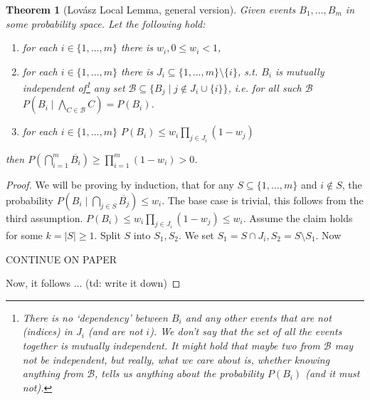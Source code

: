 \documentclass{article}
\theoremstyle{plain}
\newtheorem{thm}{Theorem}
\theoremstyle{definition}
\begin{document}
\begin{thm}[Lovász Local Lemma, general version]
	Given events $B_1,\ldots, B_m$ in some probability space. Let the following hold:
	\begin{enumerate}
		\item for each $i\in\{1,\ldots, m\}$ there is $w_i,0\leq w_i<1$,
		\item for each $i\in\{1,\ldots, m\}$ there is $J_i\subseteq \{1,\ldots, m\}\setminus \{i\}$, s.t. $B_i$ is mutually independent of\footnote{There is no `dependency' between $B_i$ and any other events that are not (indices) in $J_i$ (and are not $i$). We don't say that the set of all the events together is mutually independent. It might hold that maybe two from $\mathcal{B}$ may not be independent, but really, what we care about is, whether knowing anything from $\mathcal{B}$, tells us anything about the probability $P(B_i)$ (and it must not).} any set $\mathcal{B}\subseteq \{B_j \mid j\notin J_i\cup\{i\}\}$, i.e. for all such $\mathcal{B}$ $P(B_i\mid \bigwedge_{C\in\mathcal{B}}C)=P(B_i)$.
		\item for each $i\in\{1,\ldots,m\}$ $P(B_i)\leq w_i\prod_{j\in J_i}(1-w_j)$
	\end{enumerate}
	then $P(\bigcap_{i=1}^m\overline{B_i})\geq \prod_{i=1}^m(1-w_i)>0$.
\end{thm}

\begin{proof}
	We will be proving by induction, that for any $S\subseteq \{1,\ldots,m\}$ and $i\notin S$, the probability $P(B_i\mid \bigcap_{j\in S}\overline{B_j})\leq w_i$. The base case is trivial, this follows from the third assumption. $P(B_i)\leq w_i\prod_{j\in J_i}(1-w_j)\leq w_i$. Assume the claim holds for some $k=|S|\geq 1$. Split $S$ into $S_1,S_2$. We set $S_1=S\cap J_i,S_2=S\setminus S_1$. Now 
	
	CONTINUE ON PAPER
	
	
	
	Now, it follows ... (td: write it down)
	
\end{proof}
\end{document}
